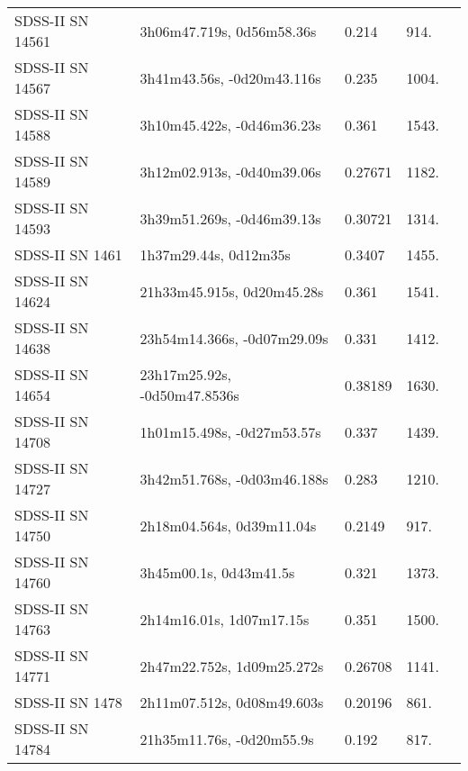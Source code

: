 \begin{longtable}{lllll}
 SDSS-II SN 14561 &      3h06m47.719s, 0d56m58.36s &    0.214 &           914. &    \citet{2010ApJ...713.1026D} \\
 SDSS-II SN 14567 &     3h41m43.56s, -0d20m43.116s &    0.235 &          1004. &    \citet{2011ApJ...738..162S} \\
 SDSS-II SN 14588 &     3h10m45.422s, -0d46m36.23s &    0.361 &          1543. &    \citet{2011ApJ...738..162S} \\
 SDSS-II SN 14589 &     3h12m02.913s, -0d40m39.06s &  0.27671 &          1182. &    \citet{2002AJ....123.1807G} \\
 SDSS-II SN 14593 &     3h39m51.269s, -0d46m39.13s &  0.30721 &          1314. &    \citet{2016SDSSD.C...0000:} \\
  SDSS-II SN 1461 &          1h37m29.44s, 0d12m35s &   0.3407 &          1455. &    \citet{2011ApJ...738..162S} \\
 SDSS-II SN 14624 &     21h33m45.915s, 0d20m45.28s &    0.361 &          1541. &    \citet{2011ApJ...738..162S} \\
 SDSS-II SN 14638 &    23h54m14.366s, -0d07m29.09s &    0.331 &          1412. &    \citet{2010ApJ...713.1026D} \\
 SDSS-II SN 14654 &   23h17m25.92s, -0d50m47.8536s &  0.38189 &          1630. &    \citet{2016SDSSD.C...0000:} \\
 SDSS-II SN 14708 &     1h01m15.498s, -0d27m53.57s &    0.337 &          1439. &    \citet{2010ApJ...713.1026D} \\
 SDSS-II SN 14727 &    3h42m51.768s, -0d03m46.188s &    0.283 &          1210. &    \citet{2011ApJ...738..162S} \\
 SDSS-II SN 14750 &      2h18m04.564s, 0d39m11.04s &   0.2149 &           917. &    \citet{2011ApJ...738..162S} \\
 SDSS-II SN 14760 &         3h45m00.1s, 0d43m41.5s &    0.321 &          1373. &    \citet{2010ApJ...713.1026D} \\
 SDSS-II SN 14763 &       2h14m16.01s, 1d07m17.15s &    0.351 &          1500. &    \citet{2010ApJ...713.1026D} \\
 SDSS-II SN 14771 &     2h47m22.752s, 1d09m25.272s &  0.26708 &          1141. &    \citet{2016SDSSD.C...0000:} \\
  SDSS-II SN 1478 &     2h11m07.512s, 0d08m49.603s &  0.20196 &           861. &    \citet{2016SDSSD.C...0000:} \\
 SDSS-II SN 14784 &      21h35m11.76s, -0d20m55.9s &    0.192 &           817. &    \citet{2011ApJ...738..162S} \\

\end{longtable}
